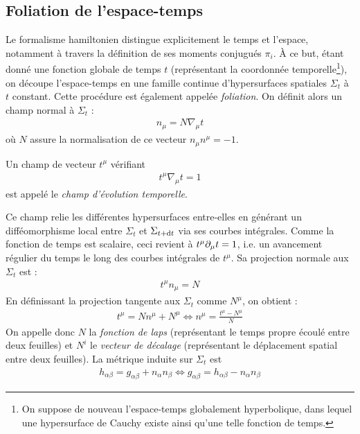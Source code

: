 \subsection{Foliation de l'espace-temps}
Le formalisme hamiltonien distingue explicitement le temps et l'espace, notamment à travers la définition de ses moments conjugués $\pi_i$. À ce but, étant donné une fonction globale de temps $t$ (représentant la coordonnée temporelle\footnote{On suppose de nouveau l'espace-temps globalement hyperbolique, dans lequel une hypersurface de Cauchy existe ainsi qu'une telle fonction de temps.}), on découpe l'espace-temps en une famille continue d'hypersurfaces spatiales $\Sigma_t$ à $t$ constant. Cette procédure est également appelée \emph{foliation}. On définit alors un champ normal à $\Sigma_t$ :
\begin{align}
    n_\mu = N \nabla_\mu t
\end{align}
où $N$ assure la normalisation de ce vecteur $n_\mu n^\mu=-1$.
\begin{theoremframe}
    \begin{defi}
        Un champ de vecteur $t^\mu$ vérifiant
        \begin{align}
            t^\mu\nabla_\mu t = 1
        \end{align}
        est appelé le \emph{champ d'évolution temporelle}.
    \end{defi}
\end{theoremframe}
Ce champ relie les différentes hypersurfaces entre-elles en générant un difféomorphisme local entre $\Sigma_t$ et $\Sigma_{t+\mathrm{d} t}$ via ses courbes intégrales. Comme la fonction de temps est scalaire, ceci revient à $t^\mu \partial_\mu t = 1$, i.e. un avancement régulier du temps le long des courbes intégrales de $t^\mu$. Sa projection normale aux $\Sigma_t$ est :
\begin{align}
    t^\mu n_\mu = N 
\end{align}
En définissant la projection tangente aux $\Sigma_t$ comme $N^\mu$, on obtient :
\begin{align}
    t^\mu = N n^\mu + N^\mu \iff n^\mu = \frac{t^\mu - N^\mu}{N}
\end{align}
On appelle donc $N$ la \emph{fonction de laps} (représentant le temps propre écoulé entre deux feuilles) et $N^i$ le \emph{vecteur de décalage} (représentant le déplacement spatial entre deux feuilles). La métrique induite sur $\Sigma_t$ est
\begin{align}
    h_{\alpha \beta} = g_{\alpha\beta} + n_\alpha n_\beta \iff g_{\alpha \beta} = h_{\alpha\beta} - n_\alpha n_\beta 
\end{align}
